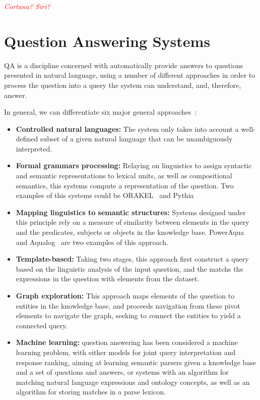 \emph{\textcolor{red}{Cortana? Siri?}}

\section{Question Answering Systems}
\label{sec:qa_sys}

\ac{QA} is a discipline concerned with automatically provide answers to questions presented in natural language, using a number of different approaches in order to process the question into a query the system can understand, and, therefore, answer.

In general, we can differentiate six major general approaches~\cite{unger2014an}:

\begin{itemize}
  \item \textbf{Controlled natural languages:} The system only takes into account a well-defined subset of a given natural language that can be unambiguously interpreted.
  \item \textbf{Formal grammars processing:} Relaying on linguistics to assign syntactic and semantic representations to lexical units, as well as compositional semantics, this systems compute a representation of the question. Two examples of this systems could be ORAKEL~\cite{cimiano2008towards} and Pythia~\cite{unger2011pythia}
  \item \textbf{Mapping linguistics to semantic structures:} Systems designed under this principle rely on a measure of similarity between elements in the query and the predicates, subjects or objects in the knowledge base. PowerAqua~\cite{lopez2011poweraqua} and Aqualog~\cite{lopez2007aqualog} are two examples of this approach.
  \item \textbf{Template-based:} Taking two stages, this approach first construct a query based on the linguistic analysis of the input question, and the matchs the expressions in the question with elements from the dataset.
  \item \textbf{Graph exploration:} This approach maps elements of the question to entities in the knowledge base, and proceeds navigation from these pivot elements to navigate the graph, seeking to connect the entities to yield a connected query.
  \item \textbf{Machine learning:} question answering has been considered a machine learning problem, with either models for joint query interpretation and response ranking, aiming at learning semantic parsers given a knowledge base and a set of questions and answers, or systems with an algorithm for matching natural language expressions and ontology concepts, as well as an algorithm for storing matches in a parse lexicon.
\end{itemize}

